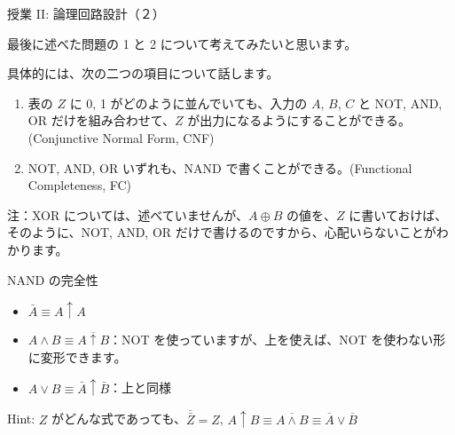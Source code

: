 \documentclass[10pt, dvipdfmx]{beamer}
\begin{document}
\begin{frame}{授業 II: 論理回路設計（２）}

最後に述べた問題の 1 と 2 について考えてみたいと思います。

具体的には、次の二つの項目について話します。
\begin{enumerate}
\item 表の \(Z\) に 0, 1 がどのように並んでいても、入力の \(A\), \(B\), \(C\) と NOT, AND, OR だけを組み合わせて、\(Z\) が出力になるようにすることができる。(Conjunctive Normal Form, CNF)
\item NOT, AND, OR いずれも、NAND で書くことができる。(Functional Completeness, FC)
\end{enumerate}
注：XOR については、述べていませんが、\(A \oplus B\) の値を、\(Z\) に書いておけば、そのように、NOT, AND, OR だけで書けるのですから、心配いらないことがわかります。
\end{frame}
\begin{frame}{NAND の完全性}
\begin{itemize}
\item \(\bar{A} \equiv A \uparrow A\)
\item \(A \land B \equiv \overline{A \uparrow B}\)：NOT を使っていますが、上を使えば、NOT を使わない形に変形できます。
\item \(A \lor B \equiv \bar{A} \uparrow \bar{B}\)：上と同様
\end{itemize}
Hint: \(Z\) がどんな式であっても、\(\overline{\bar{Z}} = Z\), \(A \uparrow B \equiv \overline{A \land B} \equiv \overline{A} \lor \overline{B}\)
\end{frame}
\end{document}
